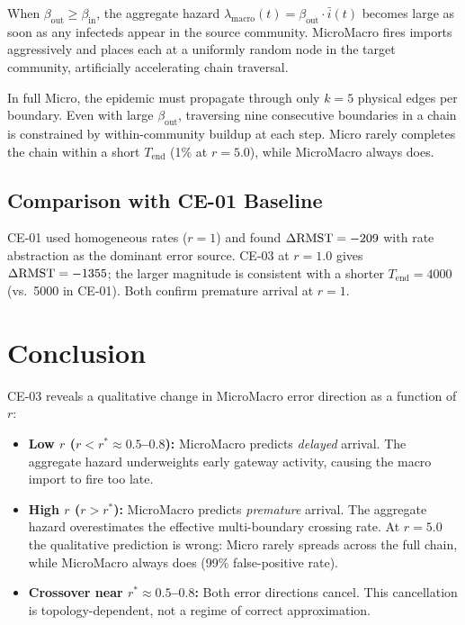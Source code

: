 \documentclass[11pt,a4paper]{article}
\begin{document}
When $\beta_{\text{out}} \ge \beta_{\text{in}}$, the aggregate hazard
$\lambda_{\text{macro}}(t) = \beta_{\text{out}} \cdot \bar{i}(t)$ becomes
large as soon as any infecteds appear in the source community.  MicroMacro
fires imports aggressively and places each at a uniformly random node in the
target community, artificially accelerating chain traversal.

In full Micro, the epidemic must propagate through only $k=5$ physical edges
per boundary.  Even with large $\beta_{\text{out}}$, traversing nine
consecutive boundaries in a chain is constrained by within-community buildup
at each step.  Micro rarely completes the chain within a short $T_{\text{end}}$
(1\% at $r=5.0$), while MicroMacro always does.

\subsection{Comparison with CE-01 Baseline}

CE-01 used homogeneous rates ($r=1$) and found $\Delta\mathrm{RMST} = -209$ with
rate abstraction as the dominant error source.  CE-03 at $r=1.0$ gives
$\Delta\mathrm{RMST} = -1355$; the larger magnitude is consistent with a shorter
$T_{\text{end}} = 4000$ (vs.\ 5000 in CE-01).  Both confirm premature
arrival at $r=1$.

\section{Conclusion}

CE-03 reveals a qualitative change in MicroMacro error direction as a function
of $r$:

\begin{itemize}
  \item \textbf{Low $r$ ($r < r^* \approx 0.5$--$0.8$):}
        MicroMacro predicts \emph{delayed} arrival.  The aggregate hazard
        underweights early gateway activity, causing the macro import to fire too late.
  \item \textbf{High $r$ ($r > r^*$):}
        MicroMacro predicts \emph{premature} arrival.  The aggregate hazard
        overestimates the effective multi-boundary crossing rate.
        At $r=5.0$ the qualitative prediction is wrong: Micro rarely spreads
        across the full chain, while MicroMacro always does (99\% false-positive rate).
  \item \textbf{Crossover near $r^* \approx 0.5$--$0.8$:}
        Both error directions cancel.  This cancellation is topology-dependent,
        not a regime of correct approximation.
\end{itemize}
\end{document}
